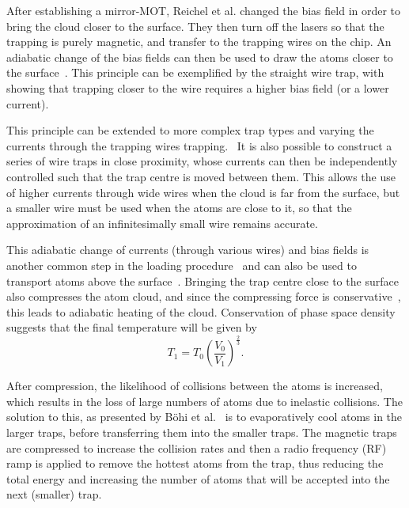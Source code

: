 After establishing a mirror-MOT, Reichel et al. changed the bias field in order
to bring the cloud closer to the surface. They then turn off the lasers so that
the trapping is purely magnetic, and transfer to the trapping
wires on the chip. An adiabatic change of the bias fields can then be used to
draw the atoms closer to the surface~\cite{Reichel1999, Folman2000}. This
principle can be exemplified by the straight wire trap, with
 showing that trapping closer to the wire requires a
higher bias field (or a lower current).

This principle can be extended to more complex trap types and varying the
currents through the trapping wires trapping.~\cite{Folman2000} It is also
possible to construct a series of wire traps in close proximity, whose currents
can then be independently controlled such that the trap centre is moved between
them. This allows the use of higher currents through wide wires when the cloud
is far from the surface, but a smaller wire must be used when the atoms are
close to it, so that the approximation of an infinitesimally small wire remains
accurate.

This adiabatic change of currents (through various wires) and bias fields is
another common step in the loading procedure~\cite{Folman2000,2011Ac,
RevModPhys.79.235} and can also be used to transport atoms above the
surface~\cite{Reichel1999, Schwindt2005}. Bringing the trap centre close to the
surface also compresses the atom cloud, and since the compressing force is
conservative~, this leads to adiabatic heating of the cloud.
Conservation of phase space density suggests that the final temperature will be
given by~\cite{Metcalf1999}
%
\begin{equation}
   T_1 = T_0\left(\frac{V_0}{V_1}\right)^\frac{2}{3}.
\end{equation}

After compression, the likelihood of collisions between the atoms is increased,
which results in the loss of large numbers of atoms due to inelastic collisions.
The solution to this, as presented by B\"ohi et al.~\cite{Boehi2009} is to
evaporatively cool atoms in the larger traps, before transferring them into the
smaller traps. The magnetic traps are compressed to increase the collision
rates and then a radio frequency (RF) ramp is applied to remove the hottest
atoms from the trap, thus reducing the total energy and increasing the number of
atoms that will be accepted into the next (smaller) trap.~\cite{Foot2005,
Metcalf1999}

